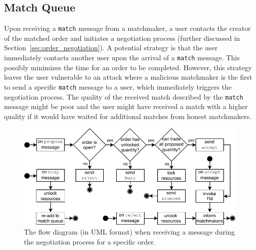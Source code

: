 


\subsection{Match Queue}
\label{sec:match_queue}
Upon receiving a \texttt{match} message from a matchmaker, a user contacts the creator of the matched order and initiates a negotiation process (further discussed in Section~\ref{sec:order_negotiation}).
A potential strategy is that the user immediately contacts another user upon the arrival of a \texttt{match} message.
This possibly minimizes the time for an order to be completed.
However, this strategy leaves the user vulnerable to an attack where a malicious matchmaker is the first to send a specific \texttt{match} message to a user, which immediately triggers the negotiation process.
The quality of the received match described by the \texttt{match} message might be poor and the user might have received a match with a higher quality if it would have waited for additional matches from honest matchmakers.

\begin{figure}[t]
	\centering
	\includegraphics[width=\linewidth]{match/assets/negotiation_diagram}
	\caption{The flow diagram (in UML format) when receiving a message during the negotiation process for a specific order.}
	\label{fig:order_negotiation_diagram}
\end{figure}


